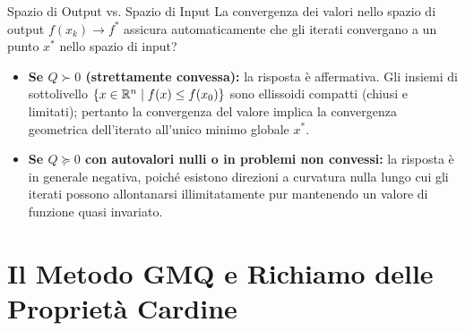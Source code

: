 \begin{noteblock}{Spazio di Output vs. Spazio di Input}
La convergenza dei valori nello spazio di output $f(x_k) \to f^*$ assicura automaticamente che gli iterati convergano a un punto $x^*$ nello spazio di input?
\begin{itemize}
    \item \textbf{Se $Q \succ 0$ (strettamente convessa):} la risposta \`e affermativa. Gli insiemi di sottolivello $\{x \in \mathbb{R}^n \mid f(x) \le f(x_0)\}$ sono ellissoidi compatti (chiusi e limitati); pertanto la convergenza del valore implica la convergenza geometrica dell'iterato all'unico minimo globale $x^*$.
    \item \textbf{Se $Q \succeq 0$ con autovalori nulli o in problemi non convessi:} la risposta \`e in generale negativa, poich\'e esistono direzioni a curvatura nulla lungo cui gli iterati possono allontanarsi illimitatamente pur mantenendo un valore di funzione quasi invariato.
\end{itemize}
\end{noteblock}

\FloatBarrier
\section{Il Metodo GMQ e Richiamo delle Propriet\`a Cardine}
\label{sec:metodo-gradiente-passo-ottimo}

